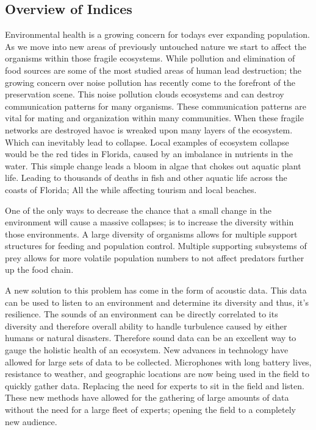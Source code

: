 \subsection{Overview of Indices}
Environmental health is a growing concern for today\textquotesingle s ever expanding population. As we move into new areas of previously untouched nature we start to affect the organisms within those fragile ecosystems. While pollution and elimination of food sources are some of the most studied areas of human lead destruction; the growing concern over noise pollution has recently come to the forefront of the preservation scene. This noise pollution clouds ecosystems and can destroy communication patterns for many organisms. These communication patterns are vital for mating and organization within many communities. When these fragile networks are destroyed havoc is wreaked upon many layers of the ecosystem.\cite{shannonWiener} Which can inevitably lead to collapse. Local examples of ecosystem collapse would be the red tides in Florida, caused by an imbalance in nutrients in the water. This simple change leads a bloom in algae that chokes out aquatic plant life. Leading to thousands of deaths in fish and other aquatic life across the coasts of Florida; All the while affecting tourism and local beaches.\par
One of the only ways to decrease the chance that a small change in the environment will cause a massive collapses; is to increase the diversity within those environments. A large diversity of organisms allows for multiple support structures for feeding and population control. Multiple supporting subsystems of prey allows for more volatile population numbers to not affect predators further up the food chain.\par
A new solution to this problem has come in the form of acoustic data. This data can be used to listen to an environment and determine its diversity and thus, it's resilience. The sounds of an environment can be directly correlated to its diversity and therefore overall ability to handle turbulence caused by either humans or natural disasters. Therefore sound data can be an excellent way to gauge the holistic health of an ecosystem. New advances in technology have allowed for large sets of data to be collected. Microphones with long battery lives, resistance to weather, and geographic locations are now being used in the field to quickly gather data. Replacing the need for experts to sit in the field and listen. These new methods have allowed for the gathering of large amounts of data without the need for a large fleet of experts; opening the field to a completely new audience.\cite{urbanBiases}\par
